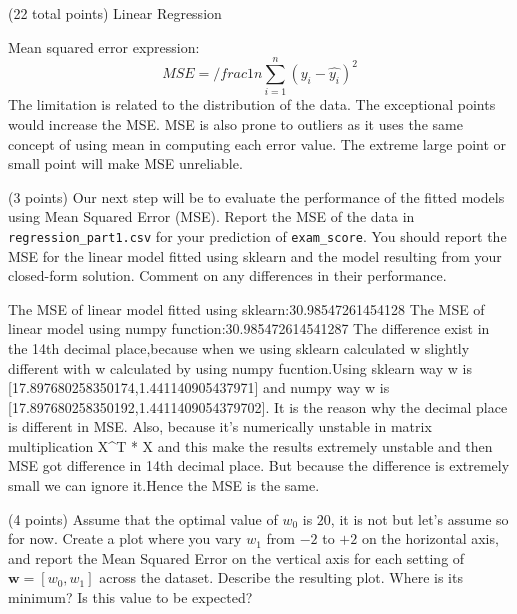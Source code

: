 \documentclass[12pt]{article}
\begin{document}
\begin{question}{(22 total points) Linear Regression}
\begin{subquestion}
\begin{answerbox}{10em}
Mean squared error expression:$$ 
MSE = {/frac{1}{n}\sum_{i=1}^{n}(y_{i}-\hat{y_{i}})^{2}}
$$
The limitation is related to the distribution of the data. The exceptional points would increase the MSE. MSE is also prone to outliers as it uses the same concept of using mean in computing each error value. The extreme large point or small point will make MSE unreliable.
\end{answerbox}



\end{subquestion}


 
%
%
\begin{subquestion}{(3 points) Our next step will be to evaluate the performance of the fitted models using Mean Squared Error (MSE). 
Report the MSE of the data in \texttt{regression\_part1.csv} for your prediction of \texttt{exam\_score}.
You should report the MSE for the linear model fitted using sklearn and the model resulting from your closed-form solution. 
Comment on any differences in their performance. 
}


\begin{answerbox}{10em}
The MSE of linear model fitted using sklearn:30.98547261454128
The MSE of linear model using numpy function:30.985472614541287
The difference exist in the 14th decimal place,because when we using sklearn calculated w slightly different with w calculated by using numpy fucntion.Using sklearn way w is [17.897680258350174,1.441140905437971] and numpy way w is [17.897680258350192,1.4411409054379702]. It is the reason why the decimal place is different in MSE. Also, because it's numerically unstable in matrix multiplication X^T * X and this make the results extremely unstable and then MSE got difference in 14th decimal place. But because the difference is extremely small we can ignore it.Hence the MSE is the same.
\end{answerbox}



\end{subquestion}




%
%
\begin{subquestion}{(4 points) Assume that the optimal value of $w_0$ is $20$, it is not but let's assume so for now. 
Create a plot where you vary $w_1$ from $-2$ to $+2$ on the horizontal axis, and report the Mean Squared Error on the vertical axis for each setting of $\mathbf{w} = [w_0, w_1]$ across the dataset. 
Describe the resulting plot. Where is its minimum? Is this value to be expected?\\ 
}



\end{subquestion}
\end{question}
\end{document}
